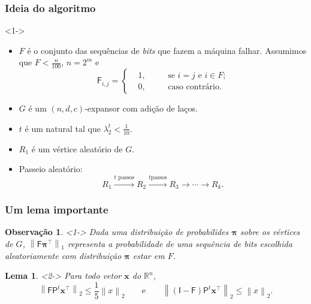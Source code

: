 \documentclass{beamer}
\def\MMR{\mathbb{R}} %
\def\MMp{\mathrm{.}} %
\def\leq{\leqslant} %
\def\vetor#1{\boldsymbol{#1}}
\def\matriz#1{\mathsf{#1}}
\def\norma#1#2{{\left\|{#2}\right\|}_{#1}}
\def\transp#1{{#1}^{\scriptscriptstyle \top}}
\theoremstyle{teoaxicorlem}
\newtheorem{Lem}[Teo]{Lema}
\theoremstyle{defnotnom}
\newtheorem{Obs}{Observação}
\begin{document}
\begin{frame}
  \frametitle{Ideia do algoritmo}
  \begin{block}<1->{}
    \begin{itemize}
    \item $F$ é o conjunto das sequências de \textit{bits} que fazem a
      máquina falhar. Assumimos que $F<\frac{n}{100}$, $n=2^m$ e
      \begin{equation*}
        {\matriz F}_{i,j} = \left\{
          \begin{aligned}
            &1, &\quad &\text{se $i=j$ e $i\in F$;}\\
            &0, &\quad &\text{caso contrário.}
          \end{aligned}
        \right.
      \end{equation*}
    \item $G$ é um $(n,d,c)$-expansor com adição de laços.
    \item $t$ é um natural tal que $\lambda^t_2<\frac1{10}$.
    \item $R_1$ é um vértice aleatório de $G$.
    \item Passeio aleatório:
      \begin{equation*}
        R_1\xrightarrow{t\text{ passos}}
        R_2\xrightarrow{t\text{passos}}
        R_3\xrightarrow{}\dotsb\xrightarrow{} R_k\MMp
      \end{equation*}
    \end{itemize}
  \end{block}
\end{frame}

\begin{frame}
  \frametitle{Um lema importante}
  \begin{Obs}<1->
    Dada uma distribuição de probabilides $\vetor \pi$ sobre os vértices
    de
    $G$, $\norma1{\matriz F\transp{\vetor \pi}}$ representa a
    probabilidade de uma sequência de \textit{bits} escolhida
    aleatoriamente com distribuição $\vetor\pi$ estar em $F$.
  \end{Obs}
  \vfill
  \begin{Lem}<2->
    Para todo vetor $\vetor x$ do $\MMR^n$,
    \begin{equation*}
      \norma2{\matriz F{\matriz P}^t\transp{\vetor x}}
      \leq \frac15\norma2 x
      \qquad\text{e}\qquad
      \norma2{(\matriz I - \matriz F){\matriz P}^t\transp{\vetor x}}
      \leq \norma2 x\MMp
    \end{equation*}
  \end{Lem}
\end{frame}
\end{document}
